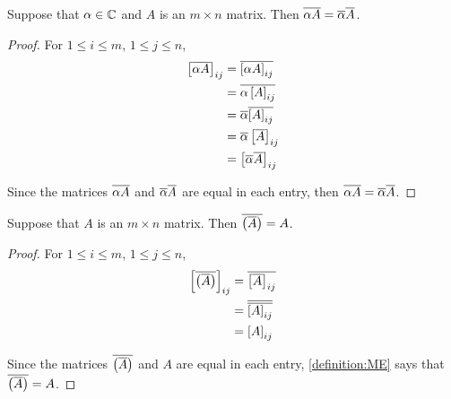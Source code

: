 \documentclass{ximera}
\begin{document}
\begin{theorem}
\label{theorem:CRMSM}

Suppose that $\alpha\in\mathbb{C}$ and $A$ is an $m\times n$ matrix.  Then $\overline{\alpha A}=\overline{\alpha}\overline{A}$.

\begin{proof}
  For $1\leq i\leq m$, $1\leq j\leq n$,
  \begin{align*}
    \matrixentry{\conjugate{\alpha A}}{ij}
    &=\conjugate{\matrixentry{\alpha A}{ij}}\\ %
    &=\conjugate{\alpha\matrixentry{A}{ij}}\\ %
    &=\conjugate{\alpha}\conjugate{\matrixentry{A}{ij}}\\ %
    &=\conjugate{\alpha}\matrixentry{\conjugate{A}}{ij}\\ %
    &=\matrixentry{\conjugate{\alpha}\conjugate{A}}{ij}\\ %
  \end{align*}
  
  Since the matrices $\overline{\alpha A}$ and
  $\overline{\alpha}\overline{A}$ are equal in each entry,
  then
  $\overline{\alpha A}=\overline{\alpha}\overline{A}$.

\end{proof}
\end{theorem}

\begin{theorem}
\label{theorem:CCM}

Suppose that $A$ is an $m\times n$ matrix.  Then $\overline{\left(\overline{A}\right)}=A$.

\begin{proof}
  For $1\leq i\leq m$, $1\leq j\leq n$,
  \begin{align*}
    \matrixentry{\conjugate{\left(\conjugate{A}\right)}}{ij}
    &=\conjugate{\matrixentry{\conjugate{A}}{ij}}\\ %
    &=\conjugate{\conjugate{\matrixentry{A}{ij}}}\\ %
    &=\matrixentry{A}{ij}\\ %
  \end{align*}
  
  Since the matrices $\overline{\left(\overline{A}\right)}$ and $A$
  are equal in each entry, \ref{definition:ME} says that
  $\overline{\left(\overline{A}\right)}=A$.

\end{proof}
\end{theorem}
\end{document}
